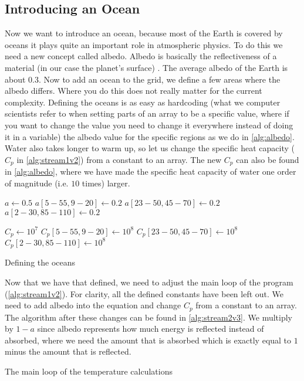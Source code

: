 \subsection{Introducing an Ocean}
Now we want to introduce an ocean, because most of the Earth is covered by oceans it plays quite an important role in atmospheric physics. To do this we need a new concept called albedo. Albedo
is basically the reflectiveness of a material (in our case the planet's surface) \cite{albedo}. The average albedo of the Earth is about 0.3. Now to add an ocean to the grid, we define a few 
areas where the albedo differs. Where you do this does not really matter for the current complexity. Defining the oceans is as easy as hardcoding (what we computer scientists refer to when 
setting parts of an array to be a specific value, where if you want to change the value you need to change it everywhere instead of doing it in a variable) the albedo value for the specific 
regions as we do in \autoref{alg:albedo}. Water also takes longer to warm up, so let us change the specific heat capacity ($C_p$ in \autoref{alg:stream1v2}) from a constant to an array. The new 
$C_p$ can also be found in \autoref{alg:albedo}, where we have made the specific heat capacity of water one order of magnitude (i.e. $10$ times) larger.

\begin{algorithm}[hbt]
    $a \leftarrow 0.5$ \;
    $a[5-55, 9-20] \leftarrow 0.2$ \;
    $a[23-50, 45-70] \leftarrow 0.2$ \;
    $a[2-30, 85-110] \leftarrow 0.2$ \;
    
    $C_p \leftarrow 10^7$ \;
    $C_p[5-55, 9-20] \leftarrow 10^8$ \;
    $C_p[23-50, 45-70] \leftarrow 10^8$ \;
    $C_p[2-30, 85-110] \leftarrow 10^8$ \;
    \caption{Defining the oceans}
    \label{alg:albedo}
\end{algorithm}

Now that we have that defined, we need to adjust the main loop of the program (\autoref{alg:stream1v2}). For clarity, all the defined constants have been left out. We need to add albedo into the
equation and change $C_p$ from a constant to an array. The algorithm after these changes can be found in \autoref{alg:stream2v3}. We multiply by $1 - a$ since albedo represents how much energy is 
reflected instead of absorbed, where we need the amount that is absorbed which is exactly equal to $1$ minus the amount that is reflected.

\begin{algorithm}[hbt]
    \SetAlgoLined

    \caption{The main loop of the temperature calculations}
    \label{alg:stream2v3}
\end{algorithm}